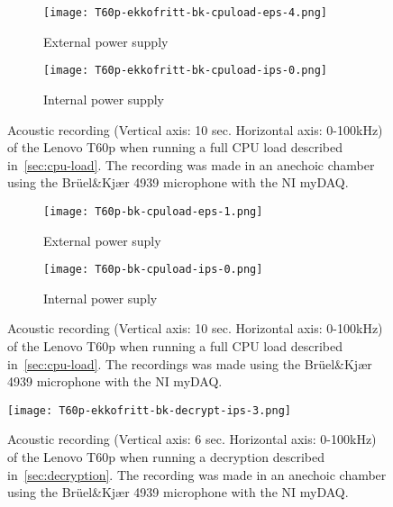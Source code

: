 \begin{wrapfigure}{r}{1\textwidth}
	\begin{subfigure}{1\textwidth}
	    \centering
	    \texttt{[image: T60p-ekkofritt-bk-cpuload-eps-4.png]}
	    \caption{External power supply}
	    \label{fig:T60p-ekkofritt-bk-cpuload-eps-4}
    \end{subfigure}
    \begin{subfigure}{1\textwidth}
	    \centering
	    \texttt{[image: T60p-ekkofritt-bk-cpuload-ips-0.png]}
	    \caption{Internal power supply}
	    \label{fig:T60p-ekkofritt-bk-cpuload-ips-0}
    \end{subfigure}
    \caption{Acoustic recording (Vertical axis: 10 sec. Horizontal axis: 0-100kHz) of the Lenovo T60p when running a full CPU load described in~\autoref{sec:cpu-load}. The recording was made in an anechoic chamber using the Brüel\&Kjær 4939 microphone with the NI myDAQ.}
	\label{fig:T60p-ekkofritt-bk-cpuload}
\end{wrapfigure}
\begin{wrapfigure}{r}{1\textwidth}
	\begin{subfigure}{1\textwidth}
	    \centering
	    \texttt{[image: T60p-bk-cpuload-eps-1.png]}
	    \caption{External power suply}
	    \label{fig:T60p-bk-cpuload-eps-1-1a}
    \end{subfigure}
    \begin{subfigure}{1\textwidth}
	    \centering
	    \texttt{[image: T60p-bk-cpuload-ips-0.png]}
	    \caption{Internal power suply}
	    \label{fig:T60p-bk-cpuload-ips-0-1b}
    \end{subfigure}
    \caption{Acoustic recording (Vertical axis: 10 sec. Horizontal axis: 0-100kHz) of the Lenovo T60p when running a full CPU load described in~\autoref{sec:cpu-load}. The recordings was made using the Brüel\&Kjær 4939 microphone with the NI myDAQ. }
	\label{fig:T60p-bk-cpuload}
\end{wrapfigure}
\begin{wrapfigure}{r}{1\textwidth}
    \centering
    \texttt{[image: T60p-ekkofritt-bk-decrypt-ips-3.png]}
    \caption{Acoustic recording (Vertical axis: 6 sec. Horizontal axis: 0-100kHz) of the Lenovo T60p when running a decryption described in~\autoref{sec:decryption}. The recording was made in an anechoic chamber using the Brüel\&Kjær 4939 microphone with the NI myDAQ. }
    \label{fig:T60p-ekkofritt-bk-decrypt-ips-3}
\end{wrapfigure}
